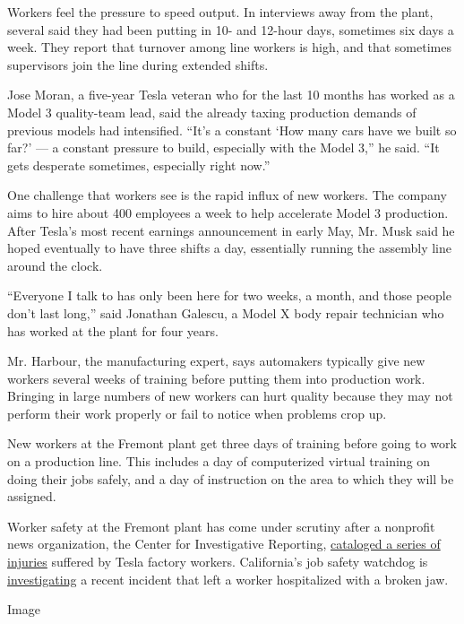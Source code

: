Workers feel the pressure to speed output. In interviews away from the
plant, several said they had been putting in 10- and 12-hour days,
sometimes six days a week. They report that turnover among line workers
is high, and that sometimes supervisors join the line during extended
shifts.

Jose Moran, a five-year Tesla veteran who for the last 10 months has
worked as a Model 3 quality-team lead, said the already taxing
production demands of previous models had intensified. ``It's a constant
`How many cars have we built so far?' --- a constant pressure to build,
especially with the Model 3,'' he said. ``It gets desperate sometimes,
especially right now.''

One challenge that workers see is the rapid influx of new workers. The
company aims to hire about 400 employees a week to help accelerate Model
3 production. After Tesla's most recent earnings announcement in early
May, Mr. Musk said he hoped eventually to have three shifts a day,
essentially running the assembly line around the clock.

``Everyone I talk to has only been here for two weeks, a month, and
those people don't last long,'' said Jonathan Galescu, a Model X body
repair technician who has worked at the plant for four years.

Mr. Harbour, the manufacturing expert, says automakers typically give
new workers several weeks of training before putting them into
production work. Bringing in large numbers of new workers can hurt
quality because they may not perform their work properly or fail to
notice when problems crop up.

New workers at the Fremont plant get three days of training before going
to work on a production line. This includes a day of computerized
virtual training on doing their jobs safely, and a day of instruction on
the area to which they will be assigned.

Worker safety at the Fremont plant has come under scrutiny after a
nonprofit news organization, the Center for Investigative Reporting,
\href{https://www.revealnews.org/article/tesla-says-its-factory-is-safer-but-it-left-injuries-off-the-books/}{cataloged
a series of injuries} suffered by Tesla factory workers. California's
job safety watchdog is
\href{https://www.nytimes3xbfgragh.onion/2018/04/20/business/tesla-plant-safety.html}{investigating}
a recent incident that left a worker hospitalized with a broken jaw.

Image

